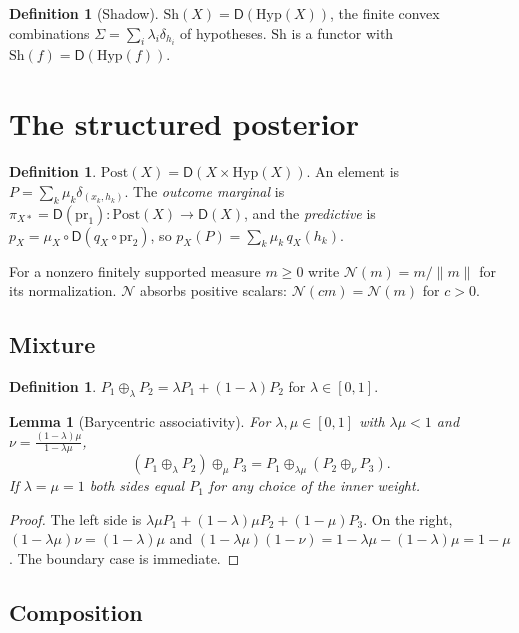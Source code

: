 \documentclass[11pt]{article}
\newtheorem{lemma}[theorem]{Lemma}
\theoremstyle{definition}
\newtheorem{definition}[theorem]{Definition}
\theoremstyle{remark}
\newcommand{\D}{\mathsf{D}}
\newcommand{\Hyp}{\mathrm{Hyp}}
\newcommand{\Sh}{\mathrm{Sh}}
\newcommand{\Post}{\mathrm{Post}}
\newcommand{\N}{\mathcal{N}}
\begin{document}
\begin{definition}[Shadow]
$\Sh(X)=\D(\Hyp(X))$, the finite convex combinations $\Sigma=\sum_i\lambda_i\delta_{h_i}$ of
hypotheses. $\Sh$ is a functor with $\Sh(f)=\D(\Hyp(f))$.
\end{definition}

\section{The structured posterior}\label{sec:post}

\begin{definition}
$\Post(X)=\D(X\times\Hyp(X))$. An element is $P=\sum_k\mu_k\delta_{(x_k,h_k)}$. The \emph{outcome
marginal} is $\pi_{X*}=\D(\mathrm{pr}_1)\colon\Post(X)\to\D(X)$, and the \emph{predictive} is
$p_X=\mu_X\circ\D(q_X\circ\mathrm{pr}_2)$, so $p_X(P)=\sum_k\mu_k\,q_X(h_k)$.
\end{definition}

For a nonzero finitely supported measure $m\ge 0$ write $\N(m)=m/\lVert m\rVert$ for its
normalization. $\N$ absorbs positive scalars: $\N(cm)=\N(m)$ for $c>0$.

\subsection{Mixture}

\begin{definition}
$P_1\oplus_\lambda P_2=\lambda P_1+(1-\lambda)P_2$ for $\lambda\in[0,1]$.
\end{definition}

\begin{lemma}[Barycentric associativity]\label{lem:baryassoc}
For $\lambda,\mu\in[0,1]$ with $\lambda\mu<1$ and $\nu=\frac{(1-\lambda)\mu}{1-\lambda\mu}$,
\[
(P_1\oplus_\lambda P_2)\oplus_\mu P_3 = P_1\oplus_{\lambda\mu}(P_2\oplus_\nu P_3).
\]
If $\lambda=\mu=1$ both sides equal $P_1$ for any choice of the inner weight.
\end{lemma}
\begin{proof}
The left side is $\lambda\mu P_1+(1-\lambda)\mu P_2+(1-\mu)P_3$. On the right,
$(1-\lambda\mu)\nu=(1-\lambda)\mu$ and $(1-\lambda\mu)(1-\nu)=1-\lambda\mu-(1-\lambda)\mu=1-\mu$. The
boundary case is immediate.
\end{proof}

\subsection{Composition}
\end{document}
